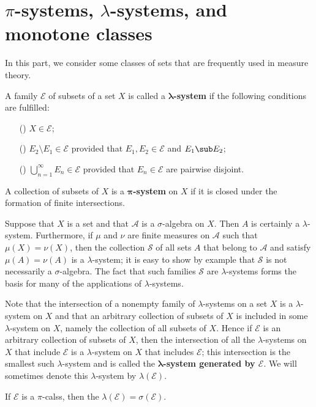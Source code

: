 \section{\boldmath$\pi$-systems, \boldmath$\lambda$-systems, and monotone classes}
In this part, we consider some classes of sets that are frequently used in measure theory.
\begin{definition}
A family $\mathcal{E}$ of subsets of a set $X$ is called a \textbf{$\bm{\lambda}$-system} if the following conditions are fulfilled:
\begin{itemize}
\item[(\rmnum{1})] $X\in\mathcal{E}$;
\item[(\rmnum{2})] $E_2\setminus E_1\in\mathcal{E}$ provided that $E_1,E_2\in\mathcal{E}$ and $E_1\sub E_2$;
\item[(\rmnum{3})] $\bigcup_{n=1}^{\infty}E_n\in\mathcal{E}$ provided that $E_n\in\mathcal{E}$ are pairwise disjoint.
\end{itemize}
\end{definition}
A collection of subsets of $X$ is a \textbf{$\bm{\pi}$-system} on $X$ if it is closed under the formation of finite intersections.
\begin{example}
Suppose that $X$ is a set and that $\mathcal{A}$ is a $\sigma$-algebra on $X$. Then $A$ is certainly a $\lambda$-system. Furthermore, if $\mu$ and $\nu$ are finite measures on $\mathcal{A}$ such that $\mu(X)=\nu(X)$, then the collection $\mathcal{S}$ of all sets $A$ that belong to $\mathcal{A}$ and satisfy $\mu(A)=\nu(A)$ is a $\lambda$-system; it is easy to show by example that $\mathcal{S}$ is not necessarily a $\sigma$-algebra. The fact that such families $\mathcal{S}$ are $\lambda$-systems forms the basis for many of the applications of $\lambda$-systems.
\end{example}
Note that the intersection of a nonempty family of $\lambda$-systems on a set $X$ is a $\lambda$-system on $X$ and that an arbitrary collection of subsets of $X$ is included in some $\lambda$-system on $X$, namely the collection of all subsets of $X$. Hence if $\mathcal{E}$ is an arbitrary collection of subsets of $X$, then the intersection of all the $\lambda$-systems on $X$ that include $\mathcal{E}$ is a $\lambda$-system on $X$ that includes $\mathcal{E}$; this intersection is the smallest such $\lambda$-system and is called the \textbf{$\bm{\lambda}$-system generated by $\mathcal{E}$}. We will sometimes denote this $\lambda$-system by $\lambda(\mathcal{E})$.
\begin{theorem}\label{pi-lambda theorem}
If $\mathcal{E}$ is a $\pi$-calss, then the $\lambda(\mathcal{E})=\sigma(\mathcal{E})$.
\end{theorem}
